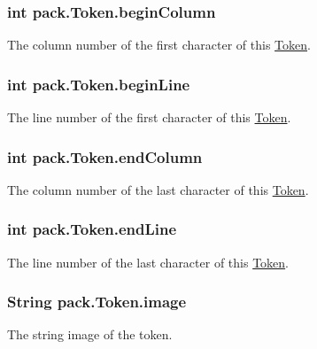 \subsubsection[{\texorpdfstring{begin\+Column}{beginColumn}}]{\setlength{\rightskip}{0pt plus 5cm}int pack.\+Token.\+begin\+Column}\hypertarget{classpack_1_1_token_a93563c3ed878705c1c2a3159b09a33f1}{}\label{classpack_1_1_token_a93563c3ed878705c1c2a3159b09a33f1}
The column number of the first character of this \hyperlink{classpack_1_1_token}{Token}. 
\subsubsection[{\texorpdfstring{begin\+Line}{beginLine}}]{\setlength{\rightskip}{0pt plus 5cm}int pack.\+Token.\+begin\+Line}\hypertarget{classpack_1_1_token_aa970f368e286c9f8bfd2859870079cbd}{}\label{classpack_1_1_token_aa970f368e286c9f8bfd2859870079cbd}
The line number of the first character of this \hyperlink{classpack_1_1_token}{Token}. 
\subsubsection[{\texorpdfstring{end\+Column}{endColumn}}]{\setlength{\rightskip}{0pt plus 5cm}int pack.\+Token.\+end\+Column}\hypertarget{classpack_1_1_token_a1937522e258fb958b41292e4bb25a8ff}{}\label{classpack_1_1_token_a1937522e258fb958b41292e4bb25a8ff}
The column number of the last character of this \hyperlink{classpack_1_1_token}{Token}. 
\subsubsection[{\texorpdfstring{end\+Line}{endLine}}]{\setlength{\rightskip}{0pt plus 5cm}int pack.\+Token.\+end\+Line}\hypertarget{classpack_1_1_token_a85c1abc6fce7795d5929a97ab8ae0839}{}\label{classpack_1_1_token_a85c1abc6fce7795d5929a97ab8ae0839}
The line number of the last character of this \hyperlink{classpack_1_1_token}{Token}. 
\subsubsection[{\texorpdfstring{image}{image}}]{\setlength{\rightskip}{0pt plus 5cm}String pack.\+Token.\+image}\hypertarget{classpack_1_1_token_a2c9f5859a8bc0fc9c72aaff47620e755}{}\label{classpack_1_1_token_a2c9f5859a8bc0fc9c72aaff47620e755}
The string image of the token. 
